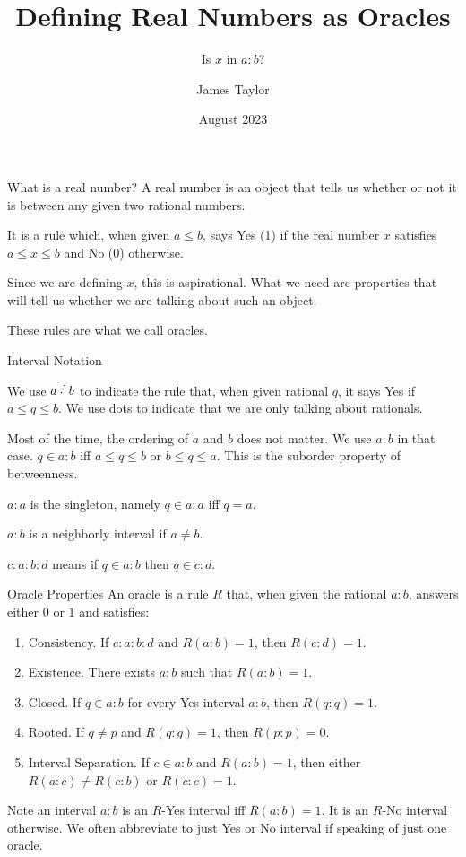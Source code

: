 \documentclass{beamer}
\title[Oracles]{Defining Real Numbers as Oracles}
\subtitle{\texorpdfstring{Is $x$ in $a:b$?}{Is x in a:b}}
\author{James Taylor}
\institute{ratmath.com}
\date{August 2023}
\begin{document}
\begin{frame}
\titlepage
\end{frame}


\begin{frame}{What is a real number?}
    A real number is an object that tells us whether or not it is between any given two rational numbers. 

    It is a rule which, when given $a \leq b$, says Yes (1) if the real number $x$ satisfies $a \leq x \leq b$ and No (0) otherwise. 

    Since we are defining $x$, this is aspirational. What we need are properties that will tell us whether we are talking about such an object. 

    These rules are what we call oracles. 
    
\end{frame}

\begin{frame}{Interval Notation}

    We use $a \lte b$ to indicate the rule that, when given rational $q$, it says Yes if  $a \leq q \leq b$. We use dots to indicate that we are only talking about rationals. 

    Most of the time, the ordering of $a$ and $b$ does not matter. We use $a : b$ in that case. $q \in a:b$ iff $a \leq q \leq b$ or $b \leq q \leq a$. This is the suborder property of betweenness. 

    $a:a$ is the singleton, namely $q \in a:a$ iff $q = a$. 

    $a:b$ is a neighborly interval if $a \neq b$.

    $c: a:b :d$ means if $q \in a:b$ then $q \in c:d$.
    
\end{frame}


\begin{frame}{Oracle Properties}
    An oracle is a rule $R$ that, when given the rational $a:b$, answers either $0$ or $1$ and satisfies:
    \begin{enumerate}
    \item Consistency. If  $c: a:b : d$ and $R(a:b) = 1$, then $R(c:d) = 1$.
    \pause
    \item Existence. There exists $a:b$ such that $R(a:b) = 1$.
    \pause
    \item Closed. If $q \in a:b$ for every Yes interval $a:b$, then $R(q:q) = 1$. 
    \pause
    \item Rooted. If $q \neq p$ and $R(q:q) =1$, then $R(p:p) = 0$.
    \pause
    \item Interval Separation. If $c \in a:b$ and $R(a:b) = 1$, then either $R(a:c) \neq R(c:b)$ or $R(c:c) =1$.
    \end{enumerate}

    Note an interval $a:b$ is an $R$-Yes interval iff $R(a:b) = 1$. It is an $R$-No interval otherwise. We often abbreviate to just Yes or No interval if speaking of  just one oracle. 

\end{frame}
\end{document}
